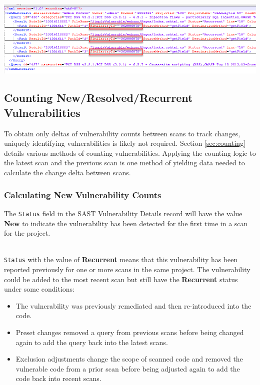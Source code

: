 \includegraphics[scale=.6]{graphics/Data-Analysis-FAQ-SimId-XML.png}

\subsection{Counting New/Resolved/Recurrent Vulnerabilities}

To obtain only deltas of vulnerability counts between scans to track changes, uniquely identifying vulnerabilities is likely not required.  Section \ref{sec:counting}
details various methods of counting vulnerabilities.  Applying the counting logic to the latest scan and the previous scan is one method of yielding data needed to
calculate the change delta between scans.


\subsubsection{Calculating New Vulnerability Counts}

The \texttt{Status} field in the SAST Vulnerability Details record will have the value \textbf{New} to indicate the vulnerability has been detected for the first time in 
a scan for the project.

\noindent\\\texttt{Status} with the value of \textbf{Recurrent} means that this vulnerability has been reported previously for one or more scans in the same project.  
The vulnerability could be added to the most recent scan but still have the \textbf{Recurrent} status under some conditions:

\begin{itemize}
    \item The vulnerability was previously remediated and then re-introduced into the code.
    \item Preset changes removed a query from previous scans before being changed again to add the query back into the latest scans.
    \item Exclusion adjustments change the scope of scanned code and removed the vulnerable code from a prior scan before being adjusted again to add the code back
    into recent scans.
\end{itemize}


